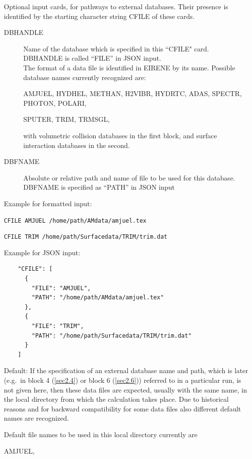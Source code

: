 Optional input cards,
for pathways to external databases.
Their presence is identified by the starting character string CFILE of these
cards.
\begin{description}
  \item[DBHANDLE] Name of the database which is specified in this ``CFILE" card.\\
  	  DBHANDLE is called ``FILE'' in JSON input. \\
        The format of a data file is identified in EIRENE by its name.
        Possible database names currently recognized are:

        AMJUEL, HYDHEL, METHAN, H2VIBR, HYDRTC, ADAS,  SPECTR, PHOTON, POLARI,

        \medskip 

        SPUTER, TRIM,  TRMSGL, 

        with volumetric collision databases in the first block, and surface interaction
        databases in the second.
  \item[DBFNAME] Absolute or relative path and name of file to be used for this
        database. \\
        DBFNAME is specified as ``PATH'' in JSON input
\end{description}
Example for formatted input:

\lstinline|CFILE AMJUEL /home/path/AMdata/amjuel.tex|

\lstinline|CFILE TRIM /home/path/Surfacedata/TRIM/trim.dat| 

\medskip

Example for JSON input:
\begin{lstlisting}
    "CFILE": [
      {
        "FILE": "AMJUEL",
        "PATH": "/home/path/AMdata/amjuel.tex"
      },
      {
        "FILE": "TRIM",
        "PATH": "/home/path/Surfacedata/TRIM/trim.dat"
      }
    ]
\end{lstlisting}

Default:
If the specification of an external database name and path, which is later
(e.g.\ in block 4 (\cref{sec2.4}) or block 6 (\cref{sec2.6})) referred to in a
particular run, is not given here, then these data files are expected, usually
with the same name, in the local directory from which the calculation takes
place.
Due to historical reasons and for backward compatibility for some data files
also different default names are recognized.

Default file names to be used in this local directory currently are

AMJUEL, 


